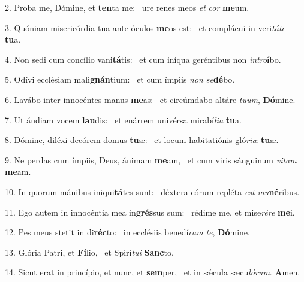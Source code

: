 2. Proba me, Dómine, et \textbf{ten}ta me: \ast\  ure renes meos \textit{et} \textit{cor} \textbf{me}um.\

3. Quóniam misericórdia tua ante óculos \textbf{me}os est: \ast\  et complácui in veri\textit{tá}\textit{te} \textbf{tu}a.\

4. Non sedi cum concílio vani\textbf{tá}tis: \ast\  et cum iníqua geréntibus non \textit{in}\textit{tro}\textbf{í}bo.\

5. Odívi ecclésiam mali\textbf{gnán}tium: \ast\  et cum ímpiis \textit{non} \textit{se}\textbf{dé}bo.\

6. Lavábo inter innocéntes manus \textbf{me}as: \ast\  et circúmdabo altáre \textit{tu}\textit{um}, \textbf{Dó}mine.\

7. Ut áudiam vocem \textbf{lau}dis: \ast\  et enárrem univérsa mirabí\textit{li}\textit{a} \textbf{tu}a.\

8. Dómine, diléxi decórem domus \textbf{tu}æ: \ast\  et locum habitatiónis gló\textit{ri}\textit{æ} \textbf{tu}æ.\

9. Ne perdas cum ímpiis, Deus, ánimam \textbf{me}am, \ast\  et cum viris sánguinum \textit{vi}\textit{tam} \textbf{me}am.\

10. In quorum mánibus iniqui\textbf{tá}tes sunt: \ast\  déxtera eórum repléta \textit{est} \textit{mu}\textbf{né}ribus.\

11. Ego autem in innocéntia mea in\textbf{grés}sus sum: \ast\  rédime me, et mise\textit{ré}\textit{re} \textbf{me}i.\

12. Pes meus stetit in di\textbf{réc}to: \ast\  in ecclésiis benedí\textit{cam} \textit{te}, \textbf{Dó}mine.\

13. Glória Patri, et \textbf{Fí}lio, \ast\  et Spirí\textit{tu}\textit{i} \textbf{Sanc}to.\

14. Sicut erat in princípio, et nunc, et \textbf{sem}per, \ast\  et in sǽcula sæcu\textit{ló}\textit{rum}. \textbf{A}men.\

